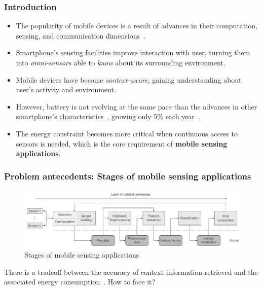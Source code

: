 \documentclass[compress,9pt,xcolor={dvipsnames,table}]{beamer}
\begin{document}
\begin{frame}[t]\frametitle{Introduction}
\begin{itemize}
  \item The popularity of mobile devices is a result of advances in their computation, sensing, and communication dimensions~\cite{Islam2014}.
  \item Smartphone's sensing facilities improve interaction with user, turning them into \emph{omni-sensors} able to \emph{know} about its surrounding environment.
  \item Mobile devices have become \emph{context-aware}, gaining understanding about user's activity and environment.
  \item However, battery is not evolving at the same pace than the advances in other smartphone's characteristics~\cite{Kjaergaard2012}, growing only 5\% each year~\cite{Ma2012}.
  \item The energy constraint becomes more critical when continuous access to sensors is needed, which is the core requirement of \textbf{mobile sensing applications}.
\end{itemize}
\end{frame}

\begin{frame}[t]\frametitle{Problem antecedents: Stages of mobile sensing applications}
\begin{figure}[tb]
  \centering
  \includegraphics[width=\textwidth]{../../../resources/images/vectors/msa-stages}
  \caption{Stages of mobile sensing applications}
  \label{fig:msa-stages}
\end{figure}
There is a tradeoff between the accuracy of context information retrieved and the associated energy consumption~\cite{Sim2014,Rachuri2012}.
How to face it?
\end{frame}
\end{document}
